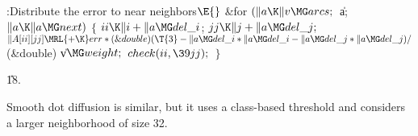 \B{}:Distribute the error to near neighbors\X${}\E{}$\6
\&{for} ${}(\|a\K\|v\MG\\{arcs};{}$ \|a; ${}\|a\K\|a\MG\\{next}){}$\5
${}\{{}$\1\6
${}\\{ii}\K\|i+\|a\MG\\{del\_i}{}$;\5
${}\\{jj}\K\|j+\|a\MG\\{del\_j};{}$\6
${}\|A[\\{ii}][\\{jj}]\MRL{+{\K}}\\{err}*(\&{double})(\T{3}-\|a\MG\\{del\_i}*%
\|a\MG\\{del\_i}-\|a\MG\\{del\_j}*\|a\MG\\{del\_j})/{}$(\&{double}) \|v${}\MG%
\\{weight};{}$\6
${}\\{check}(\\{ii},\39\\{jj});{}$\6
\4${}\}{}$\2\par
\U18.\fi

Smooth dot diffusion is similar, but it uses a class-based
threshold
and considers a larger neighborhood of size 32.

